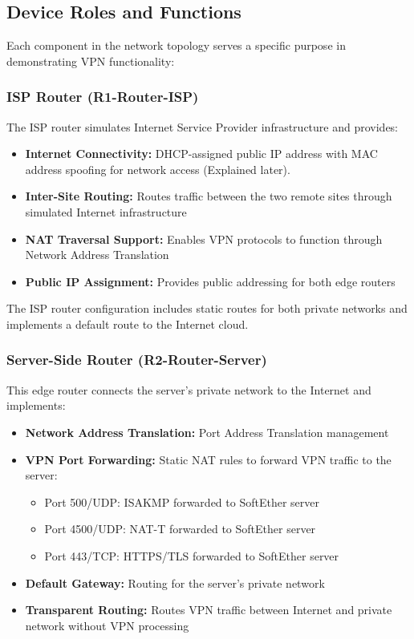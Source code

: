 \subsection{Device Roles and Functions}

Each component in the network topology serves a specific purpose in demonstrating VPN functionality:

\subsubsection{ISP Router (R1-Router-ISP)}

The ISP router simulates Internet Service Provider infrastructure and provides:

\begin{itemize}
    \item \textbf{Internet Connectivity:} DHCP-assigned public IP address with MAC address spoofing for network access (Explained later).
    \item \textbf{Inter-Site Routing:} Routes traffic between the two remote sites through simulated Internet infrastructure
    \item \textbf{NAT Traversal Support:} Enables VPN protocols to function through Network Address Translation
    \item \textbf{Public IP Assignment:} Provides public addressing for both edge routers
\end{itemize}

The ISP router configuration includes static routes for both private networks and implements a default route to the Internet cloud.

\subsubsection{Server-Side Router (R2-Router-Server)}

This edge router connects the server's private network to the Internet and implements:

\begin{itemize}
    \item \textbf{Network Address Translation:} Port Address Translation management
    \item \textbf{VPN Port Forwarding:} Static NAT rules to forward VPN traffic to the server:
    \begin{itemize}
        \item Port 500/UDP: ISAKMP forwarded to SoftEther server
        \item Port 4500/UDP: NAT-T forwarded to SoftEther server
        \item Port 443/TCP: HTTPS/TLS forwarded to SoftEther server
    \end{itemize}
    \item \textbf{Default Gateway:} Routing for the server's private network
    \item \textbf{Transparent Routing:} Routes VPN traffic between Internet and private network without VPN processing
\end{itemize}

